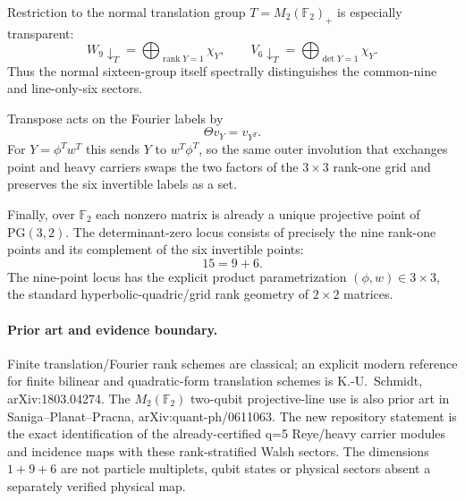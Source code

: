 Restriction to the normal translation group $T=M_2(\mathbb F_2)_+$ is
especially transparent:
\[
 \boxed{
 W_9\downarrow_T
 =\bigoplus_{\operatorname{rank}Y=1}\chi_Y,
 }
 \qquad
 \boxed{
 V_6\downarrow_T
 =\bigoplus_{\det Y=1}\chi_Y.
 }
\]
Thus the normal sixteen-group itself spectrally distinguishes the common-nine
and line-only-six sectors.

Transpose acts on the Fourier labels by
\[
 \boxed{\Theta v_Y=v_{Y^T}}.
\]
For $Y=\phi^Tw^T$ this sends $Y$ to $w^T\phi^T$, so the same outer involution
that exchanges point and heavy carriers swaps the two factors of the
$3\times3$ rank-one grid and preserves the six invertible labels as a set.

Finally, over $\mathbb F_2$ each nonzero matrix is already a unique projective
point of $\mathrm{PG}(3,2)$.  The determinant-zero locus consists of precisely
the nine rank-one points and its complement of the six invertible points:
\[
 \boxed{15=9+6}.
\]
The nine-point locus has the explicit product parametrization
$(\phi,w)\in3\times3$, the standard hyperbolic-quadric/grid rank geometry of
$2\times2$ matrices.

\paragraph{Prior art and evidence boundary.}
Finite translation/Fourier rank schemes are classical; an explicit modern
reference for finite bilinear and quadratic-form translation schemes is
K.-U.~Schmidt, arXiv:1803.04274.  The $M_2(\mathbb F_2)$ two-qubit
projective-line use is also prior art in Saniga--Planat--Pracna,
arXiv:quant-ph/0611063.  The new repository statement is the exact
identification of the already-certified q=5 Reye/heavy carrier modules and
incidence maps with these rank-stratified Walsh sectors.  The dimensions
$1+9+6$ are not particle multiplets, qubit states or physical sectors absent a
separately verified physical map.
